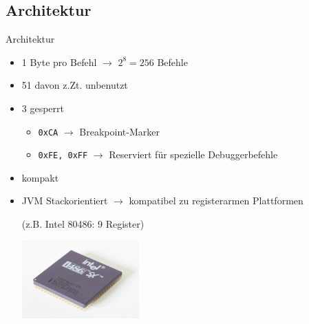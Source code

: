 \documentclass[10pt]{beamer}
\begin{document}
\subsection{Architektur}
\begin{frame}{Architektur}
\begin{itemize}
\item 1 Byte pro Befehl $\rightarrow$ $2^8=256$ Befehle
\item 51 davon z.Zt. unbenutzt
\item 3 gesperrt
\begin{itemize}
\item {\tt 0xCA} $\rightarrow$ Breakpoint-Marker
\item {\tt 0xFE, 0xFF} $\rightarrow$ Reserviert für spezielle Debuggerbefehle
\end{itemize}
\item kompakt
\end{itemize}

\begin{itemize}
\item JVM Stackorientiert $\rightarrow$ kompatibel zu registerarmen Plattformen

(z.B. Intel 80486: 9 Register)

\begin{center}
\includegraphics[width=4.5cm]{intel486.jpg}
\end{center}
\end{itemize}
\end{frame}

\end{document}
